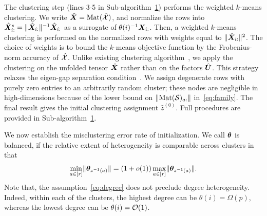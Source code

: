 \documentclass[lettersize,onecolumn,journal]{IEEEtran}
\theoremstyle{definition}
\theoremstyle{definition}
\begin{document}
The clustering step (lines 3-5 in Sub-algorithm~\hyperref[alg:main]{1}) performs the weighted $k$-means clustering. 
{
\color{blue}
We write $\hat {\bm X}=\text{Mat}(\hat {\mathcal{X}})$, and normalize the rows into $\hat {\bm X}^s_{i:}=\lVert\hat {\bm X}_{i:}\rVert^{-1}\hat {\bm X}_{i:}$ as a surrogate of $\theta(i)^{-1} \bm X_{i:}$. Then, a weighted $k$-means clustering is performed on the normalized rows with weights equal to $\lVert\hat {\bm X}_{i:}\rVert^2$. 
}
The choice of weights is to bound the $k$-means objective function by the Frobenius-norm accuracy of $\hat {\mathcal{X}}$. 
Unlike existing clustering algorithm~\citep{ke2019community}, we apply the clustering on the unfolded tensor $\hat {\bm X}$ rather than on the factors $\hat {\bm{U}}$. This strategy relaxes the eigen-gap separation condition~\citep{gao2018community, han2020exact}.
{
\color{blue}
We assign degenerate rows with purely zero entries to an arbitrarily random cluster; these nodes are negligible in high-dimensions because of the lower bound on $\lVert\text{Mat}(\mathcal{S})_{a:}\rVert$ in~\eqref{eq:family}. The final result gives the initial clustering assignment $\hat z^{(0)}$. 
}
Full procedures are provided in Sub-algorithm~\hyperref[alg:main]{1}. 


We now establish the misclustering error rate of initialization. We call $\boldsymbol{\theta}$ is balanced, if the relative extent of heterogeneity is comparable across clusters in that
\begin{equation}\label{eq:degree}
{\min_{a\in[r]} \onormSize{}{\mtheta_{z^{-1}(a)}}=\left(1+o(1)\right)\max_{a\in[r]}\onormSize{}{\mtheta_{z^{-1}(a)}}}.
\end{equation}
Note that, the assumption~\eqref{eq:degree} does not preclude degree heterogeneity. Indeed, within each of the clusters, the highest degree can be $\theta(i) = \Omega(p)$, whereas the lowest degree can be $\theta(i)=\mathcal{O}(1)$. 
\end{document}
